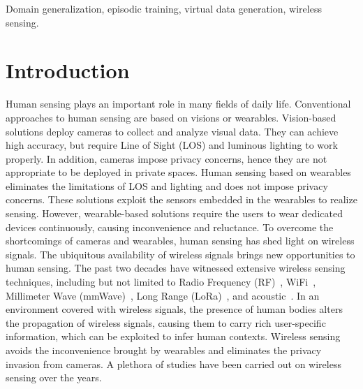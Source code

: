 \documentclass[journal]{IEEEtran}
\begin{document}
\begin{IEEEkeywords}
Domain generalization, episodic training, virtual data generation, wireless sensing.
\end{IEEEkeywords}


\section{Introduction}
Human sensing plays an important role in many fields of daily life. Conventional approaches to human sensing are based on visions or wearables. Vision-based solutions deploy cameras to collect and analyze visual data. They can achieve high accuracy, but require Line of Sight (LOS) and luminous lighting to work properly. In addition, cameras impose privacy concerns, hence they are not appropriate to be deployed in private spaces. Human sensing based on wearables eliminates the limitations of LOS and lighting and does not impose privacy concerns. These solutions exploit the sensors embedded in the wearables to realize sensing. However, wearable-based solutions require the users to wear dedicated devices continuously, causing inconvenience and reluctance.  
%
To overcome the shortcomings of cameras and wearables, human sensing has shed light on wireless signals. The ubiquitous availability of wireless signals brings new opportunities to human sensing. The past two decades have witnessed extensive wireless sensing techniques, including but not limited to Radio Frequency (RF)~\cite{Sigg:2013,Orphomma:2013}, WiFi~\cite{MaYS:2019,LiuJ:2020}, Millimeter Wave (mmWave)~\cite{LiuH:2020,ZhaoP:2021}, Long Range (LoRa)~\cite{Bashima:2019,ZhangF:2020}, and acoustic~\cite{CaiC:2022,WangY:2022}. In an environment covered with wireless signals, the presence of human bodies alters the propagation of wireless signals, causing them to carry rich user-specific information, which can be exploited to infer human contexts. Wireless sensing avoids the inconvenience brought by wearables and eliminates the privacy invasion from cameras. A plethora of studies have been carried out on wireless sensing over the years. 
\end{document}
